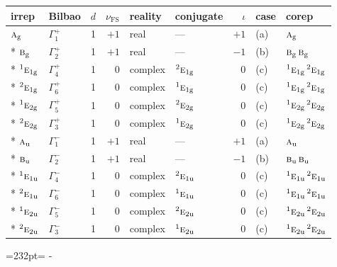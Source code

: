 \documentclass[10pt,a4paper]{article}
\newcommand{\needspace}[1]{\par\penalty-100\begingroup\dimen0=#1\relax\dimen2=\pagegoal
  \advance\dimen2-\pagetotal\ifdim\dimen0>\dimen2\relax\ifdim\dimen2>0pt\vfil\break\fi\fi
  \endgroup}
\numberwithin{equation}{section}
\newcommand{\irr}[1]{\text{\normalfont\scshape #1}}
\newcommand{\conjpair}[1]{{}^{#1}}
\newcommand{\ptag}[1]{\mathrm{#1}}
\newcommand{\fsind}{\nu_{\mathrm{FS}}}
\begin{document}
{\small\renewcommand{\arraystretch}{1.25}\setlength{\tabcolsep}{4pt}\begin{longtable}{@{}llrrllrll@{}}\toprule
irrep & Bilbao & $d$ & $\fsind$ & reality & conjugate & $\iota$ & case & corep\\\midrule\endhead
\bottomrule\endfoot\endlastfoot
$\irr{a}_{\ptag{g}}$ & $\Gamma_{1}^{+}$ & 1 & $+1$ & real & --- & $+1$ & (a) & $\irr{a}_{\ptag{g}}$\\*
$\irr{b}_{\ptag{g}}$ & $\Gamma_{2}^{+}$ & 1 & $+1$ & real & --- & $-1$ & (b) & $\irr{b}_{\ptag{g}}\,\irr{b}_{\ptag{g}}$\\*
$\conjpair{1}\irr{e}_{1\ptag{g}}$ & $\Gamma_{4}^{+}$ & 1 & $0$ & complex & $\conjpair{2}\irr{e}_{1\ptag{g}}$ & $0$ & (c) & $\conjpair{1}\irr{e}_{1\ptag{g}}\,\conjpair{2}\irr{e}_{1\ptag{g}}$\\*
$\conjpair{2}\irr{e}_{1\ptag{g}}$ & $\Gamma_{6}^{+}$ & 1 & $0$ & complex & $\conjpair{1}\irr{e}_{1\ptag{g}}$ & $0$ & (c) & $\conjpair{1}\irr{e}_{1\ptag{g}}\,\conjpair{2}\irr{e}_{1\ptag{g}}$\\*
$\conjpair{1}\irr{e}_{2\ptag{g}}$ & $\Gamma_{5}^{+}$ & 1 & $0$ & complex & $\conjpair{2}\irr{e}_{2\ptag{g}}$ & $0$ & (c) & $\conjpair{1}\irr{e}_{2\ptag{g}}\,\conjpair{2}\irr{e}_{2\ptag{g}}$\\*
$\conjpair{2}\irr{e}_{2\ptag{g}}$ & $\Gamma_{3}^{+}$ & 1 & $0$ & complex & $\conjpair{1}\irr{e}_{2\ptag{g}}$ & $0$ & (c) & $\conjpair{1}\irr{e}_{2\ptag{g}}\,\conjpair{2}\irr{e}_{2\ptag{g}}$\\*
$\irr{a}_{\ptag{u}}$ & $\Gamma_{1}^{-}$ & 1 & $+1$ & real & --- & $+1$ & (a) & $\irr{a}_{\ptag{u}}$\\*
$\irr{b}_{\ptag{u}}$ & $\Gamma_{2}^{-}$ & 1 & $+1$ & real & --- & $-1$ & (b) & $\irr{b}_{\ptag{u}}\,\irr{b}_{\ptag{u}}$\\*
$\conjpair{1}\irr{e}_{1\ptag{u}}$ & $\Gamma_{4}^{-}$ & 1 & $0$ & complex & $\conjpair{2}\irr{e}_{1\ptag{u}}$ & $0$ & (c) & $\conjpair{1}\irr{e}_{1\ptag{u}}\,\conjpair{2}\irr{e}_{1\ptag{u}}$\\*
$\conjpair{2}\irr{e}_{1\ptag{u}}$ & $\Gamma_{6}^{-}$ & 1 & $0$ & complex & $\conjpair{1}\irr{e}_{1\ptag{u}}$ & $0$ & (c) & $\conjpair{1}\irr{e}_{1\ptag{u}}\,\conjpair{2}\irr{e}_{1\ptag{u}}$\\*
$\conjpair{1}\irr{e}_{2\ptag{u}}$ & $\Gamma_{5}^{-}$ & 1 & $0$ & complex & $\conjpair{2}\irr{e}_{2\ptag{u}}$ & $0$ & (c) & $\conjpair{1}\irr{e}_{2\ptag{u}}\,\conjpair{2}\irr{e}_{2\ptag{u}}$\\*
$\conjpair{2}\irr{e}_{2\ptag{u}}$ & $\Gamma_{3}^{-}$ & 1 & $0$ & complex & $\conjpair{1}\irr{e}_{2\ptag{u}}$ & $0$ & (c) & $\conjpair{1}\irr{e}_{2\ptag{u}}\,\conjpair{2}\irr{e}_{2\ptag{u}}$\\
\bottomrule\end{longtable}}
\needspace{232pt}
\end{document}
